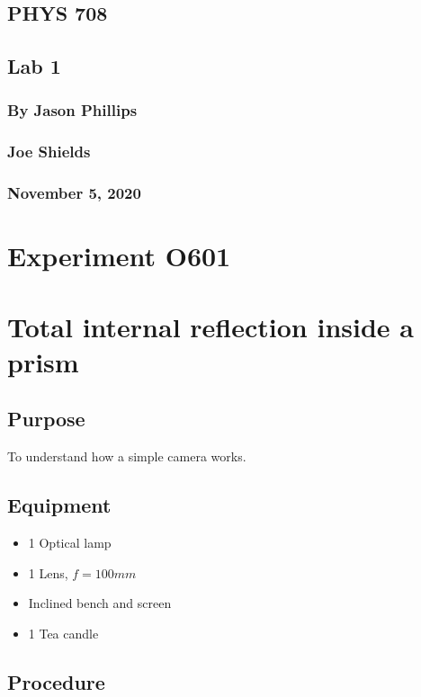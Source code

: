\documentclass[12pt]{article}
\begin{document}
\begin{center}
\section*{PHYS 708}
\subsection*{Lab 1}
\subsubsection*{By Jason Phillips}
\subsubsection*{Joe Shields}
\subsubsection*{November 5, 2020}
\end{center}

\section*{Experiment O601}

\section*{Total internal reflection inside a prism}

\subsection*{Purpose}

To understand how a simple camera works.

\subsection*{Equipment}

\begin{itemize}
\item 1 Optical lamp
\item 1 Lens, $f=100 mm$
\item Inclined bench and screen
\item 1 Tea candle
\end{itemize}

\subsection*{Procedure}
\end{document}
